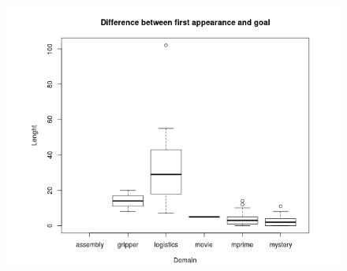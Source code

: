 \documentclass[handout,t]{beamer}
\begin{document}
\begin{frame}
  \begin{figure}[ht!]
    \centering
    \includegraphics[width=0.75\linewidth]{bxplt_FirstApp_Domain}
    \label{fig::figura9} 
  \end{figure}    
\end{frame}
\end{document}
